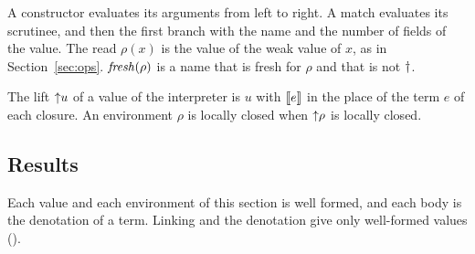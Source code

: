 A constructor evaluates its arguments from left to right.
A match evaluates its scrutinee, and then the first branch with the name and the number of fields of the value.
The read $\rho(x)$ is the value of the weak value of $x$, as in Section~\ref{sec:ops}.
$\mathit{fresh}(\rho)$ is a name that is fresh for $\rho$ and that is not $\dagger$.

The lift ${\uparrow}{u}$ of a value of the interpreter is $u$ with $\llbracket{e}\rrbracket$ in the place of the term $e$ of each closure.
An environment $\rho$ is locally closed when ${\uparrow}{\rho}$ is locally closed.

\subsection{Results}

Each value and each environment of this section is well formed, and each body is the denotation of a term.
Linking and the denotation give only well-formed values ().

